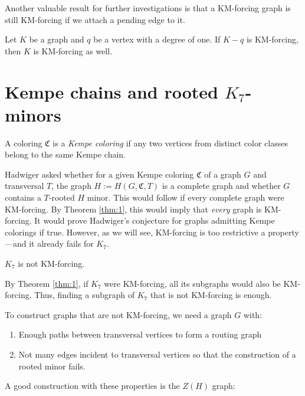 Another valuable result for further investigations is that a KM-forcing graph is still KM-forcing if we attach a pending edge to it.

\begin{thm}
\label{thm:2}
 Let $K$ be a graph and $q$ be a vertex with a degree of one. If $K - q$ is KM-forcing, then $K$ is KM-forcing as well.
\end{thm}


\section{Kempe chains and rooted $K_7$-minors}

\begin{defn}
 A coloring $\mathfrak{C}$ is a \emph{Kempe coloring} if any two vertices from distinct color classes belong 
 to the same Kempe chain. 
\end{defn}

Hadwiger \cite{hadwiger_1943} asked whether for a given Kempe coloring $\mathfrak{C}$ of a graph $G$ and transversal $T$, the graph $H:= H(G, \mathfrak{C}, T)$ is a complete graph 
and whether $G$ contains a $T$-rooted $H$ minor. This would follow if every complete graph were KM-forcing. 
By Theorem \ref{thm:1}, this would imply that \textit{every} graph is KM-forcing. 
It would prove Hadwiger's conjecture for graphs admitting Kempe colorings if true. 
However, as we will see, KM-forcing is too restrictive a property—and it already fails for $K_7$.

\begin{thm}\label{thm:3}
$K_7$ is not KM-forcing.
\end{thm}

By Theorem \ref{thm:1}, if $K_7$ were KM-forcing, all its subgraphs would also be KM-forcing. Thus, finding a subgraph of $K_7$ that is not KM-forcing is enough.

To construct graphs that are not KM-forcing, we need a graph $G$ with:
\begin{enumerate}
\item Enough paths between transversal vertices to form a routing graph
\item Not many edges incident to transversal vertices so that the construction of a rooted minor fails.
\end{enumerate}

A good construction with these properties is the \textit{$Z(H)$} graph:

